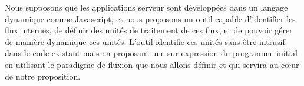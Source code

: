Nous supposons que les applications serveur sont développées dans un langage dynamique comme Javascript, et nous proposons un outil capable d'identifier les flux internes, de définir des unités de traitement de ces flux, et de pouvoir gérer de manière dynamique ces unités.
L'outil identifie ces unités sans être intrusif dans le code existant mais en proposant une sur-expression du programme initial en utilisant le paradigme de fluxion que nous allons définir et qui servira au cœur de notre proposition.

